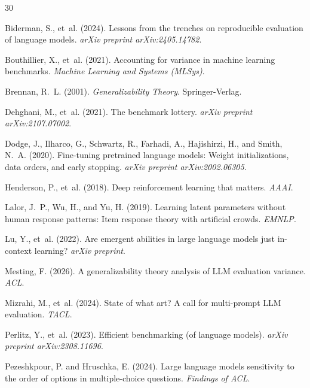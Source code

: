 \documentclass[11pt,twocolumn]{article}
\begin{document}
\begin{thebibliography}{30}

Biderman, S., et~al. (2024).
\newblock Lessons from the trenches on reproducible evaluation of language models.
\newblock \emph{arXiv preprint arXiv:2405.14782}.

Bouthillier, X., et~al. (2021).
\newblock Accounting for variance in machine learning benchmarks.
\newblock \emph{Machine Learning and Systems (MLSys)}.

Brennan, R.~L. (2001).
\newblock \emph{Generalizability Theory}.
\newblock Springer-Verlag.

Dehghani, M., et~al. (2021).
\newblock The benchmark lottery.
\newblock \emph{arXiv preprint arXiv:2107.07002}.

Dodge, J., Ilharco, G., Schwartz, R., Farhadi, A., Hajishirzi, H., and Smith, N.~A. (2020).
\newblock Fine-tuning pretrained language models: Weight initializations, data orders, and early stopping.
\newblock \emph{arXiv preprint arXiv:2002.06305}.

Henderson, P., et~al. (2018).
\newblock Deep reinforcement learning that matters.
\newblock \emph{AAAI}.

Lalor, J.~P., Wu, H., and Yu, H. (2019).
\newblock Learning latent parameters without human response patterns: Item response theory with artificial crowds.
\newblock \emph{EMNLP}.

Lu, Y., et~al. (2022).
\newblock Are emergent abilities in large language models just in-context learning?
\newblock \emph{arXiv preprint}.

Mesting, F. (2026).
\newblock A generalizability theory analysis of LLM evaluation variance.
\newblock \emph{ACL}.

Mizrahi, M., et~al. (2024).
\newblock State of what art? A call for multi-prompt LLM evaluation.
\newblock \emph{TACL}.

Perlitz, Y., et~al. (2023).
\newblock Efficient benchmarking (of language models).
\newblock \emph{arXiv preprint arXiv:2308.11696}.

Pezeshkpour, P. and Hruschka, E. (2024).
\newblock Large language models sensitivity to the order of options in multiple-choice questions.
\newblock \emph{Findings of ACL}.


\end{thebibliography}
\end{document}
